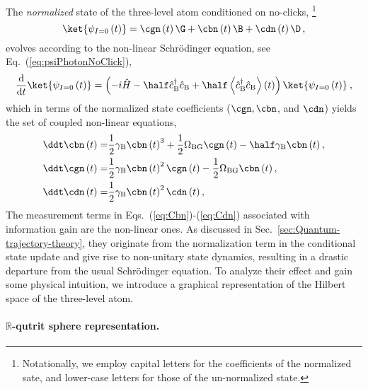 The \emph{normalized} state of the three-level atom conditioned on
no-clicks, \footnote{Notationally, we employ capital letters for the coefficients of the
normalized sate, and lower-case letters for those of the un-normalized
state.} 
\begin{equation}
\ket{\psi_{I=0}\left(t\right)}=\cgn\left(t\right)\G+\cbn\left(t\right)\B+\cdn\left(t\right)\D\,,\label{eq:psiPhotonNL}
\end{equation}
evolves according to the non-linear Schrödinger equation, see Eq.~(\ref{eq:psiPhotonNoClick}),
\begin{equation}
\frac{\mathrm{d}}{\mathrm{d}t}\ket{\psi_{I=0}\left(t\right)}=\left(-i\hat{H}-\half\hat{c}_{{\rm B}}^{\dagger}\hat{c}_{{\rm B}}+\half\left\langle \hat{c}_{{\rm B}}^{\dagger}\hat{c}_{{\rm B}}\right\rangle \left(t\right)\right)\ket{\psi_{I=0}\left(t\right)}\:,\label{eq:NL-SSe-Cond-3}
\end{equation}
which in terms of the normalized state coefficients ($\cgn,\cbn$,
and $\cdn$) yields the set of coupled non-linear equations,
\begin{align}
\ddt\cbn\left(t\right)= & \frac{1}{2}\gamma_{{\rm B}}\cbn\left(t\right)^{3}+\frac{1}{2}\Omega_{{\rm BG}}\cgn\left(t\right)-\half\gamma_{{\rm B}}\cbn\left(t\right),\label{eq:Cbn}\\
\ddt\cgn\left(t\right)= & \frac{1}{2}\gamma_{{\rm B}}\cbn\left(t\right)^{2}\cgn\left(t\right)-\frac{1}{2}\Omega_{{\rm BG}}\cbn\left(t\right),\label{eq:Cgn}\\
\ddt\cdn\left(t\right)= & \frac{1}{2}\gamma_{{\rm B}}\cbn\left(t\right)^{2}\cdn\left(t\right),\label{eq:Cdn}
\end{align}
The measurement terms in Eqs.~(\ref{eq:Cbn})-(\ref{eq:Cdn}) associated
with information gain are the non-linear ones. As discussed in Sec.~\ref{sec:Quantum-trajectory-theory},
they originate from the normalization term in the conditional state
update and give rise to non-unitary state dynamics, resulting in a
drastic departure from the usual Schrödinger equation. To analyze
their effect and gain some physical intuition, we introduce a graphical
representation of the Hilbert space of the three-level atom.

\paragraph{$\mathbb{R}$-qutrit sphere representation. }

